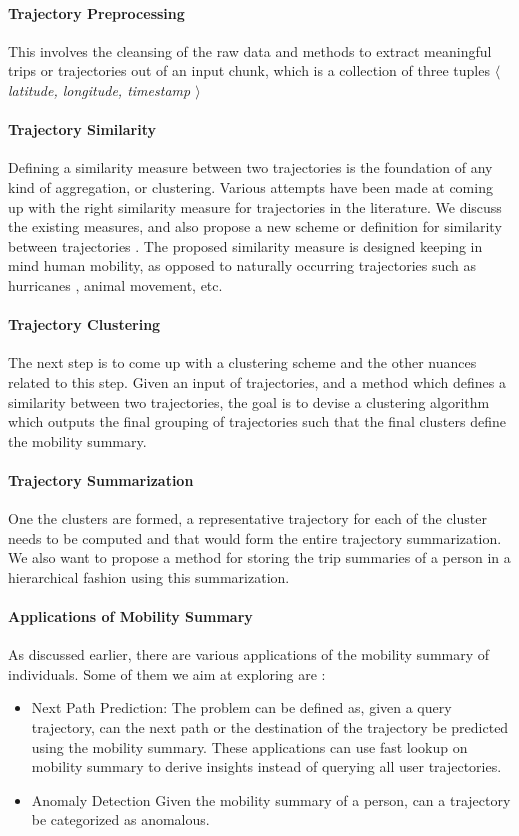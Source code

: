 \paragraph{Trajectory Preprocessing}
This involves the cleansing of the raw data and methods to extract meaningful trips or trajectories out of an input chunk, which is a collection of three tuples \emph{$\langle$ latitude, longitude, timestamp $\rangle$ }
\paragraph{Trajectory Similarity}
Defining a similarity measure between two trajectories is the foundation of any kind of aggregation, or clustering. Various attempts have been made at coming up with the right similarity measure for trajectories in the literature. We discuss the existing measures, and also propose a new scheme or definition for similarity between trajectories . The proposed similarity measure is designed keeping in mind human mobility, as opposed to naturally occurring trajectories such as hurricanes , animal movement, etc.
\paragraph{Trajectory Clustering}
The next step is to come up with a clustering scheme and the other nuances related to this step. Given an input of trajectories, and a method which defines a similarity between two trajectories, the goal is to devise a clustering algorithm which outputs the final grouping of trajectories such that the final clusters define the mobility summary.
\paragraph{Trajectory Summarization} 
One the clusters are formed, a representative trajectory for each of the cluster needs to be computed and that would form the entire trajectory summarization. We also want to propose a method for storing the trip summaries of a person in a hierarchical fashion using this summarization. 
\paragraph{Applications of Mobility Summary}
As discussed earlier, there are various applications of the mobility summary of individuals. Some of them we aim at exploring are :
\begin{itemize}
\item Next Path Prediction:
The problem can be defined as, given a query trajectory, can the next path or the destination of the trajectory be predicted using the mobility summary. These applications can use fast lookup on mobility summary to derive insights instead of querying all user trajectories. 
\item Anomaly Detection
Given the mobility summary of a person, can a trajectory be categorized as anomalous. 
\end{itemize}




